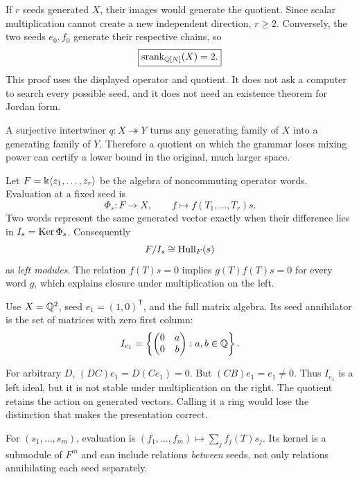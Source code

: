 If $r$ seeds generated $X$, their images would generate the quotient. Since scalar multiplication cannot create a new independent direction, $r\ge2$. Conversely, the two seeds $e_0,f_0$ generate their respective chains, so
\[
\boxed{\operatorname{srank}_{\mathbb Q[N]}(X)=2.}
\]
This proof uses the displayed operator and quotient. It does not ask a computer to search every possible seed, and it does not need an existence theorem for Jordan form.

A surjective intertwiner $q:X\twoheadrightarrow Y$ turns any generating family of $X$ into a generating family of $Y$. Therefore a quotient on which the grammar loses mixing power can certify a lower bound in the original, much larger space.


Let $F=\Bbbk\langle z_1,\ldots,z_r\rangle$ be the algebra of noncommuting operator words. Evaluation at a fixed seed is
\[
\Phi_s:F\to X,\qquad f\mapsto f(T_1,\ldots,T_r)s.
\]
Two words represent the same generated vector exactly when their difference lies in $I_s=\operatorname{Ker}\Phi_s$. Consequently
\[
F/I_s\cong\operatorname{Hull}_F(s)
\]
as \emph{left modules}. The relation $f(T)s=0$ implies $g(T)f(T)s=0$ for every word $g$, which explains closure under multiplication on the left.

Use $X=\mathbb Q^2$, seed $e_1=(1,0)^\mathsf T$, and the full matrix algebra. Its seed annihilator is the set of matrices with zero first column:
\[
I_{e_1}=\left\{\begin{pmatrix}0&a\\0&b\end{pmatrix}:a,b\in\mathbb Q\right\}.
\]


For arbitrary $D$, $(DC)e_1=D(Ce_1)=0$. But $(CB)e_1=e_1\ne0$. Thus $I_{e_1}$ is a left ideal, but it is not stable under multiplication on the right. The quotient retains the action on generated vectors. Calling it a ring would lose the distinction that makes the presentation correct.

For $(s_1,\ldots,s_m)$, evaluation is $(f_1,\ldots,f_m)\mapsto\sum_j f_j(T)s_j$. Its kernel is a submodule of $F^m$ and can include relations \emph{between} seeds, not only relations annihilating each seed separately.

